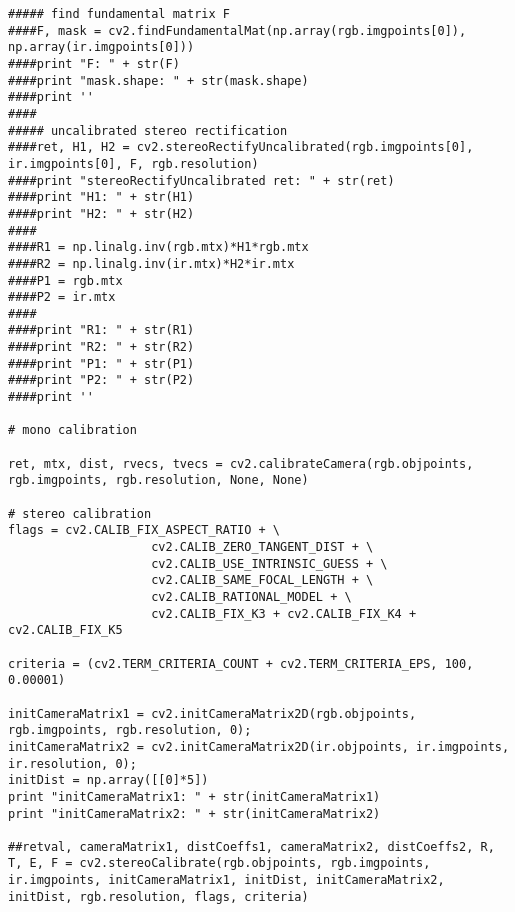 \begin{appendices}
\begin{lstlisting}
##### find fundamental matrix F
####F, mask = cv2.findFundamentalMat(np.array(rgb.imgpoints[0]), np.array(ir.imgpoints[0]))
####print "F: " + str(F)
####print "mask.shape: " + str(mask.shape)
####print ''
####
##### uncalibrated stereo rectification
####ret, H1, H2 = cv2.stereoRectifyUncalibrated(rgb.imgpoints[0], ir.imgpoints[0], F, rgb.resolution)
####print "stereoRectifyUncalibrated ret: " + str(ret)
####print "H1: " + str(H1)
####print "H2: " + str(H2)
####
####R1 = np.linalg.inv(rgb.mtx)*H1*rgb.mtx
####R2 = np.linalg.inv(ir.mtx)*H2*ir.mtx
####P1 = rgb.mtx
####P2 = ir.mtx
####
####print "R1: " + str(R1)
####print "R2: " + str(R2)
####print "P1: " + str(P1)
####print "P2: " + str(P2)
####print ''

# mono calibration

ret, mtx, dist, rvecs, tvecs = cv2.calibrateCamera(rgb.objpoints, rgb.imgpoints, rgb.resolution, None, None)

# stereo calibration
flags = cv2.CALIB_FIX_ASPECT_RATIO + \
                    cv2.CALIB_ZERO_TANGENT_DIST + \
                    cv2.CALIB_USE_INTRINSIC_GUESS + \
                    cv2.CALIB_SAME_FOCAL_LENGTH + \
                    cv2.CALIB_RATIONAL_MODEL + \
                    cv2.CALIB_FIX_K3 + cv2.CALIB_FIX_K4 + cv2.CALIB_FIX_K5

criteria = (cv2.TERM_CRITERIA_COUNT + cv2.TERM_CRITERIA_EPS, 100, 0.00001)

initCameraMatrix1 = cv2.initCameraMatrix2D(rgb.objpoints, rgb.imgpoints, rgb.resolution, 0);
initCameraMatrix2 = cv2.initCameraMatrix2D(ir.objpoints, ir.imgpoints, ir.resolution, 0);
initDist = np.array([[0]*5])
print "initCameraMatrix1: " + str(initCameraMatrix1)
print "initCameraMatrix2: " + str(initCameraMatrix2)
    
##retval, cameraMatrix1, distCoeffs1, cameraMatrix2, distCoeffs2, R, T, E, F = cv2.stereoCalibrate(rgb.objpoints, rgb.imgpoints, ir.imgpoints, initCameraMatrix1, initDist, initCameraMatrix2, initDist, rgb.resolution, flags, criteria)


\end{lstlisting}
\end{appendices}
